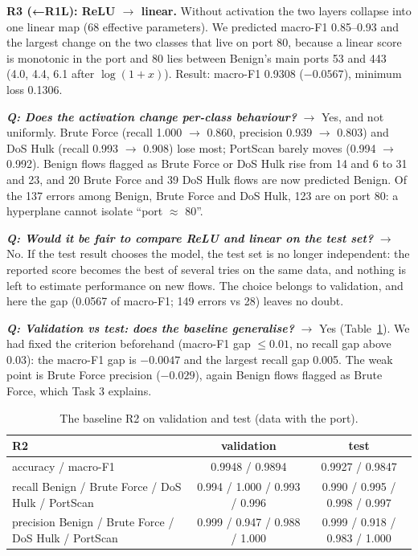 \documentclass[9pt]{extarticle}
\newcommand{\Q}[1]{\textbf{\emph{Q: #1}}}
\newcommand{\run}[1]{\textsf{#1}}
\begin{document}
\textbf{\run{R3 (←R1L)}: ReLU $\rightarrow$ linear.} Without activation the two layers collapse into one linear map (68 effective parameters). We predicted macro-F1 0.85--0.93 and the largest change on the two classes that live on port 80, because a linear score is monotonic in the port and 80 lies between Benign's main ports 53 and 443 (4.0, 4.4, 6.1 after $\log(1+x)$). Result: macro-F1 0.9308 ($-0.0567$), minimum loss 0.1306.

\Q{Does the activation change per-class behaviour?} $\rightarrow$ Yes, and not uniformly. Brute Force (recall 1.000 $\rightarrow$ 0.860, precision 0.939 $\rightarrow$ 0.803) and DoS Hulk (recall 0.993 $\rightarrow$ 0.908) lose most; PortScan barely moves (0.994 $\rightarrow$ 0.992). Benign flows flagged as Brute Force or DoS Hulk rise from 14 and 6 to 31 and 23, and 20 Brute Force and 39 DoS Hulk flows are now predicted Benign. Of the 137 errors among Benign, Brute Force and DoS Hulk, 123 are on port 80: a hyperplane cannot isolate ``port $\approx$ 80''.

\Q{Would it be fair to compare ReLU and linear on the test set?} $\rightarrow$ No. If the test result chooses the model, the test set is no longer independent: the reported score becomes the best of several tries on the same data, and nothing is left to estimate performance on new flows. The choice belongs to validation, and here the gap (0.0567 of macro-F1; 149 errors vs 28) leaves no doubt.

\Q{Validation vs test: does the baseline generalise?} $\rightarrow$ Yes (Table~\ref{tab:test2}). We had fixed the criterion beforehand (macro-F1 gap $\le 0.01$, no recall gap above 0.03): the macro-F1 gap is $-0.0047$ and the largest recall gap 0.005. The weak point is Brute Force precision ($-0.029$), again Benign flows flagged as Brute Force, which Task 3 explains.

\begin{table}[h]
\centering\small
\begin{tabular}{lcc}
\toprule
\run{R2} & validation & test \\
\midrule
accuracy / macro-F1 & 0.9948 / 0.9894 & 0.9927 / 0.9847 \\
recall Benign / Brute Force / DoS Hulk / PortScan & 0.994 / 1.000 / 0.993 / 0.996 & 0.990 / 0.995 / 0.998 / 0.997 \\
precision Benign / Brute Force / DoS Hulk / PortScan & 0.999 / 0.947 / 0.988 / 1.000 & 0.999 / 0.918 / 0.983 / 1.000 \\
\bottomrule
\end{tabular}
\caption{The baseline \run{R2} on validation and test (data with the port).}
\label{tab:test2}
\end{table}
\end{document}
